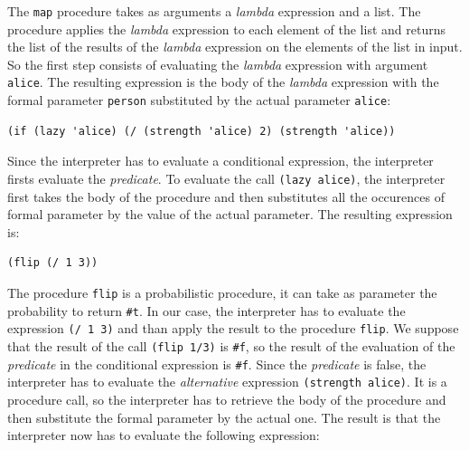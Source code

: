 \begin{itemize}
        The \texttt{map} procedure takes as arguments a \textit{lambda} expression and a list. The procedure applies the
        \textit{lambda} expression to each element of the list and returns the list of the results of the \textit{lambda}
        expression on the elements of the list in input.
        So the first step consists of evaluating the \textit{lambda} expression with argument \texttt{\textquotesingle alice}. 
        The resulting expression is the body of the \textit{lambda} expression with the formal parameter \texttt{person} substituted 
        by the actual parameter \texttt{\textquotesingle alice}:
        \begin{lstlisting}[caption={Application of \texttt{map} prcedure of Listing~\ref{lst:map}}, 
            captionpos=b, label={lst:lambda-body}]
(if (lazy 'alice) (/ (strength 'alice) 2) (strength 'alice))
        \end{lstlisting}
        Since the interpreter has to evaluate a conditional expression, the interpreter firsts evaluate the \textit{predicate}.
        To evaluate the call \texttt{(lazy \textquotesingle alice)}, the interpreter first takes the body of the procedure and then substitutes
        all the occurences of formal parameter by the value of the actual parameter. The resulting expression is:
        \begin{lstlisting}[caption={Body of procedure \texttt{lazy} when evaluating Listing~\ref{lst:lambda-body}}, captionpos=b]
(flip (/ 1 3))
        \end{lstlisting}
        The procedure \texttt{flip} is a probabilistic procedure, it can take as parameter the probability to return \texttt{\#t}.
        In our case, the interpreter has to evaluate the expression \texttt{(/ 1 3)} and than apply the result to the procedure 
        \texttt{flip}.
        We suppose that the result of the call \texttt{(flip 1/3)} is \texttt{\#f}, so the result of the evaluation of the
        \textit{predicate} in the conditional expression is \texttt{\#f}. Since the \textit{predicate} is false, the interpreter has
        to evaluate the \textit{alternative} expression \texttt{(strength \textquotesingle alice)}.
        It is a procedure call, so the interpreter has to retrieve the body of the procedure and then substitute the formal
        parameter by the actual one.
        The result is that the interpreter now has to evaluate the following expression:
        \begin{lstlisting}[caption={Body of procedure \texttt{strength} when evaluating Listing~\ref{lst:lambda-body}}, captionpos=b]

\end{lstlisting}
\end{itemize}
